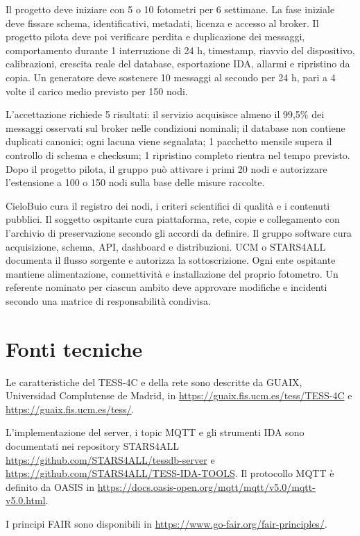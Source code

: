 \documentclass[11pt,a4paper]{report}
\begin{document}
Il progetto deve iniziare con 5 o 10 fotometri per 6 settimane. La fase iniziale deve fissare schema, identificativi, metadati, licenza e accesso al broker. Il progetto pilota deve poi verificare perdita e duplicazione dei messaggi, comportamento durante 1 interruzione di 24 h, timestamp, riavvio del dispositivo, calibrazioni, crescita reale del database, esportazione IDA, allarmi e ripristino da copia. Un generatore deve sostenere 10 messaggi al secondo per 24 h, pari a 4 volte il carico medio previsto per 150 nodi.

L'accettazione richiede 5 risultati: il servizio acquisisce almeno il 99,5\% dei messaggi osservati sul broker nelle condizioni nominali; il database non contiene duplicati canonici; ogni lacuna viene segnalata; 1 pacchetto mensile supera il controllo di schema e checksum; 1 ripristino completo rientra nel tempo previsto. Dopo il progetto pilota, il gruppo può attivare i primi 20 nodi e autorizzare l'estensione a 100 o 150 nodi sulla base delle misure raccolte.

CieloBuio cura il registro dei nodi, i criteri scientifici di qualità e i contenuti pubblici. Il soggetto ospitante cura piattaforma, rete, copie e collegamento con l'archivio di preservazione secondo gli accordi da definire. Il gruppo software cura acquisizione, schema, API, dashboard e distribuzioni. UCM o STARS4ALL documenta il flusso sorgente e autorizza la sottoscrizione. Ogni ente ospitante mantiene alimentazione, connettività e installazione del proprio fotometro. Un referente nominato per ciascun ambito deve approvare modifiche e incidenti secondo una matrice di responsabilità condivisa.

\section*{Fonti tecniche}

\small

Le caratteristiche del TESS-4C e della rete sono descritte da GUAIX, Universidad Complutense de Madrid, in \url{https://guaix.fis.ucm.es/tess/TESS-4C} e \url{https://guaix.fis.ucm.es/tess/}.

L'implementazione del server, i topic MQTT e gli strumenti IDA sono documentati nei repository STARS4ALL \url{https://github.com/STARS4ALL/tessdb-server} e \url{https://github.com/STARS4ALL/TESS-IDA-TOOLS}. Il protocollo MQTT è definito da OASIS in \url{https://docs.oasis-open.org/mqtt/mqtt/v5.0/mqtt-v5.0.html}.

I principi FAIR sono disponibili in \url{https://www.go-fair.org/fair-principles/}.
\end{document}
